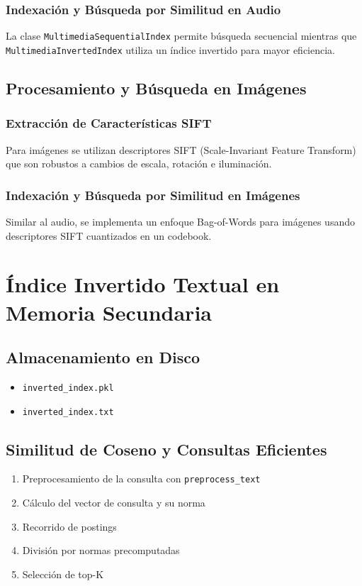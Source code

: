 \documentclass[a4paper,12pt]{report}
\begin{document}
\subsection{Indexación y Búsqueda por Similitud en Audio}
La clase \texttt{MultimediaSequentialIndex} permite búsqueda secuencial mientras que \texttt{MultimediaInvertedIndex} utiliza un índice invertido para mayor eficiencia.

\section{Procesamiento y Búsqueda en Imágenes}
\subsection{Extracción de Características SIFT}
Para imágenes se utilizan descriptores SIFT (Scale-Invariant Feature Transform) que son robustos a cambios de escala, rotación e iluminación.

\subsection{Indexación y Búsqueda por Similitud en Imágenes}
Similar al audio, se implementa un enfoque Bag-of-Words para imágenes usando descriptores SIFT cuantizados en un codebook.

\chapter{Índice Invertido Textual en Memoria Secundaria}
\section{Almacenamiento en Disco}
\begin{itemize}
  \item \texttt{inverted\_index.pkl}
  \item \texttt{inverted\_index.txt}
\end{itemize}

\section{Similitud de Coseno y Consultas Eficientes}
\begin{enumerate}
  \item Preprocesamiento de la consulta con \texttt{preprocess\_text}
  \item Cálculo del vector de consulta y su norma
  \item Recorrido de postings
  \item División por normas precomputadas
  \item Selección de top-K
\end{enumerate}
\end{document}
